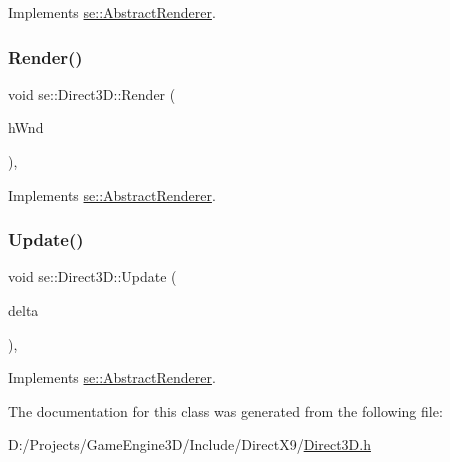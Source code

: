 Implements \mbox{\hyperlink{classse_1_1_abstract_renderer_a98e35b7db62827580573185ed91b25bb}{se\+::\+Abstract\+Renderer}}.

\mbox{\label{classse_1_1_direct3_d_a255a03bb492fb97f19e4c353f9ac35e6}} 
\subsubsection{\texorpdfstring{Render()}{Render()}}
{\footnotesize\ttfamily void se\+::\+Direct3\+D\+::\+Render (\begin{DoxyParamCaption}\item[{H\+W\+ND}]{h\+Wnd }\end{DoxyParamCaption})\hspace{0.3cm}{\ttfamily [override]}, {\ttfamily [virtual]}}



Implements \mbox{\hyperlink{classse_1_1_abstract_renderer_acdc5f90b702a6c85c53d9b93334ae230}{se\+::\+Abstract\+Renderer}}.

\mbox{\label{classse_1_1_direct3_d_a39934c194406f108a992d82a4d265381}} 
\subsubsection{\texorpdfstring{Update()}{Update()}}
{\footnotesize\ttfamily void se\+::\+Direct3\+D\+::\+Update (\begin{DoxyParamCaption}\item[{float}]{delta }\end{DoxyParamCaption})\hspace{0.3cm}{\ttfamily [override]}, {\ttfamily [virtual]}}



Implements \mbox{\hyperlink{classse_1_1_abstract_renderer_aae49e7417663d6a5aca34a2bb37b4b28}{se\+::\+Abstract\+Renderer}}.



The documentation for this class was generated from the following file\+:\begin{DoxyCompactItemize}
\item 
D\+:/\+Projects/\+Game\+Engine3\+D/\+Include/\+Direct\+X9/\mbox{\hyperlink{_direct3_d_8h}{Direct3\+D.\+h}}\end{DoxyCompactItemize}
